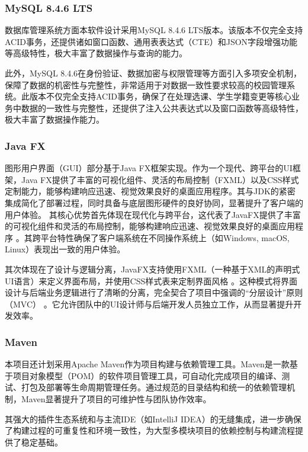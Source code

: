 \subsubsection{MySQL 8.4.6 LTS}

数据库管理系统方面本软件设计采用MySQL 8.4.6 LTS版本。该版本不仅完全支持ACID事务，还提供诸如窗口函数、通用表表达式（CTE）和JSON字段增强功能等高级特性，极大丰富了数据操作与查询的能力。

此外，MySQL 8.4.6在身份验证、数据加密与权限管理等方面引入多项安全机制，保障了数据的机密性与完整性，非常适用于对数据一致性要求较高的校园管理系统。此版本不仅完全支持ACID事务，确保了在处理选课、学生学籍变更等核心业务中数据的一致性与完整性，还提供了注入公共表达式以及窗口函数等高级特性，极大丰富了数据操作能力。

\subsubsection{Java FX}

图形用户界面（GUI）部分基于Java FX框架实现。作为一个现代、跨平台的UI框架，Java FX提供了丰富的可视化组件、灵活的布局控制（FXML）以及CSS样式定制能力，能够构建响应迅速、视觉效果良好的桌面应用程序。其与JDK的紧密集成简化了部署过程，同时具备与底层图形硬件的良好协同，显著提升了客户端的用户体验。
其核心优势首先体现在现代化与跨平台，这代表了JavaFX提供了丰富的可视化组件和灵活的布局控制，能够构建响应迅速、视觉效果良好的桌面应用程序 。其跨平台特性确保了客户端系统在不同操作系统上（如Windows, macOS, Linux）表现出一致的用户体验。

其次体现在了设计与逻辑分离，JavaFX支持使用FXML（一种基于XML的声明式UI语言）来定义界面布局，并使用CSS样式表来定制界面风格 。这种模式将界面设计与后端业务逻辑进行了清晰的分离，完全契合了项目中强调的“分层设计”原则（MVC） 。它允许团队中的UI设计师与后端开发人员独立工作，从而显著提升开发效率。

\subsubsection{Maven}

本项目还计划采用Apache Maven作为项目构建与依赖管理工具。Maven是一款基于项目对象模型（POM）的软件项目管理工具，可自动化完成项目的编译、测试、打包及部署等生命周期管理任务。通过规范的目录结构和统一的依赖管理机制，Maven显著提升了项目的可维护性与团队协作效率。

其强大的插件生态系统和与主流IDE（如IntelliJ IDEA）的无缝集成，进一步确保了构建过程的可重复性和环境一致性，为大型多模块项目的依赖控制与构建流程提供了稳定基础。
